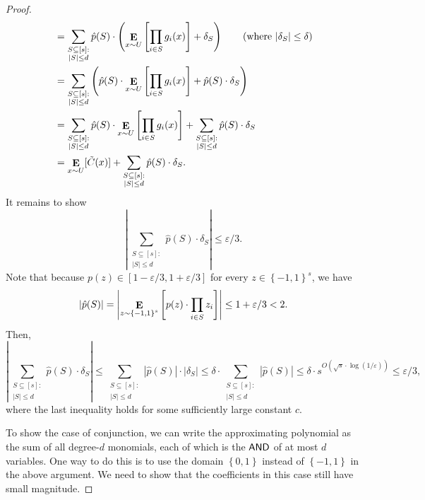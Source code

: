 \documentclass[10pt,a4paper]{article}
\DeclareMathOperator*\Exp{{\bf E}}
\newcommand{\bool}{\left\{0,1\right\}}
\newcommand{\boolpm}{\left\{-1,1\right\}}
\newcommand{\AND}{{\sf AND}}
\newcommand{\uniform}{U}
\begin{document}
\begin{proof}
\begin{align*}
        	&=\sum_{\substack{S\subseteq[s]: \\ |S|\leq d}}\hat{p}(S)\cdot\left(\Exp_{x\sim \uniform}\left[\prod_{i\in S}g_i(x)\right]+\delta_S\right) \tag{where $|\delta_S|\leq \delta$} \\
        	&=\sum_{\substack{S\subseteq[s]: \\ |S|\leq d}}\left(\hat{p}(S)\cdot\Exp_{x\sim \uniform}\left[\prod_{i\in S}g_i(x)\right]+\hat{p}(S)\cdot\delta_S\right)\\
        	&=\sum_{\substack{S\subseteq[s]: \\ |S|\leq d}}\hat{p}(S)\cdot\Exp_{x\sim \uniform}\left[\prod_{i\in S}g_i(x)\right]+\sum_{\substack{S\subseteq[s]: \\ |S|\leq d}} \hat{p}(S)\cdot\delta_S\\
        	&=\Exp_{x\sim \uniform}[\tilde{C}(x)]+\sum_{\substack{S\subseteq[s]: \\ |S|\leq d}} \hat{p}(S)\cdot \delta_S.
    	\end{align*}
    	It remains to show
    	\[
    		\left| \sum_{\substack{S\subseteq[s]: \\ |S|\leq d}} \hat{p}(S)\cdot \delta_S \right| \leq \varepsilon/3.
    	\]
    	Note that because $p(z)\in[1-\varepsilon/3,1+\varepsilon/3]$ for every $z\in\boolpm^s$, we have
    	\[
    		|\hat{p}(S)|=\left|\Exp_{z\sim \boolpm^s}\left[p(z)\cdot\prod_{i\in S} z_i\right]\right| \leq 1+\varepsilon/3 < 2.
    	\]
    	Then,
    	\[
    		\left|\sum_{\substack{S\subseteq[s]: \\ |S|\leq d}} \hat{p}(S)\cdot \delta_S \right| \leq  \sum_{\substack{S\subseteq[s]: \\ |S|\leq d}} |\hat{p}(S)|\cdot |\delta_S|\leq \delta \cdot \sum_{\substack{S\subseteq[s]: \\ |S|\leq d}} |\hat{p}(S)| \leq \delta\cdot s^{O(\sqrt{s}\cdot\log(1/\varepsilon))} \leq \varepsilon/3,
    	\]
    	where the last inequality holds for some sufficiently large constant $c$.
    	
    	To show the case of conjunction, we can write the approximating polynomial as the sum of all degree-$d$ monomials, each of which is the $\AND$ of at most $d$ variables. One way to do this is to use the domain $\bool$ instead of $\boolpm$ in the above argument. We need to show that the coefficients in this case still have small magnitude.
    	

\end{proof}
\end{document}
